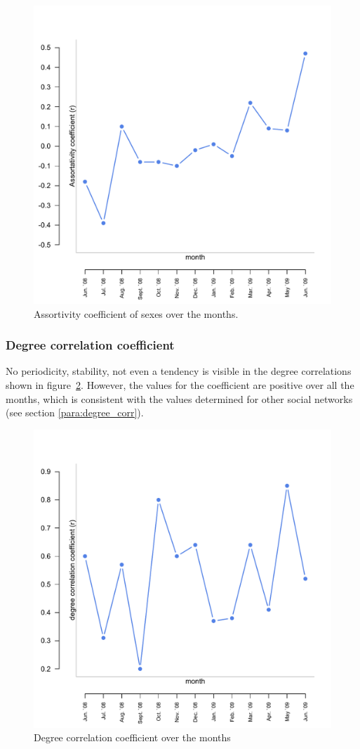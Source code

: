\begin{figure}[htpb]
\begin{center}
  \includegraphics[width=.6\textwidth]{assets/pdf/long_gender_corr.pdf}
  \caption[Assortivity coefficient of sexes over the months]{Assortivity coefficient of sexes over the months.}
  \label{fig:long_gender_corr}
\end{center}
\end{figure} 


\subsubsection{Degree correlation coefficient}

No periodicity, stability, not even a tendency is visible in the degree correlations shown in figure~\ref{fig:long_degree_cor}. However, the values for the coefficient are positive over all the months, which is consistent with the values determined for other social networks (see section \ref{para:degree_corr}). 

\begin{figure}[hbtp]
\begin{center}
  \includegraphics[width=.6\textwidth]{assets/pdf/long_degree_corr.pdf}
  \caption[Degree correlation coefficient over the months]{Degree correlation coefficient over the months}
  \label{fig:long_degree_cor}
\end{center}
\end{figure} 


